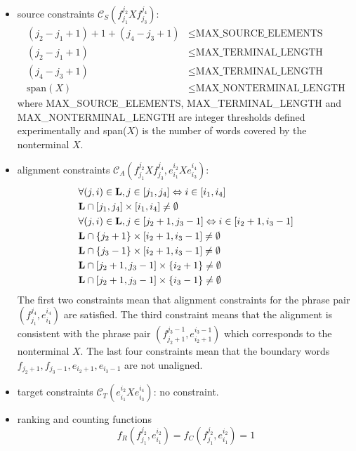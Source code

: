 \begin{itemize}
  \item source constraints $\mathcal{C}_S(f_{j_1}^{j_2} X f_{j_3}^{j_4})$:
%
\begin{equation}
  \begin{split}
    (j_2 - j_1 + 1) + 1 + (j_4 - j_3 + 1) &\leq \mbox{MAX\_SOURCE\_ELEMENTS} \\
    (j_2 - j_1 + 1) &\leq \mbox{MAX\_TERMINAL\_LENGTH} \\
    (j_4 - j_3 + 1) &\leq \mbox{MAX\_TERMINAL\_LENGTH} \\
    \mbox{span}(X) &\leq \mbox{MAX\_NONTERMINAL\_LENGTH}
  \end{split}
\end{equation}
%
where MAX\_SOURCE\_ELEMENTS, MAX\_TERMINAL\_LENGTH and MAX\_NONTERMINAL\_LENGTH
are integer thresholds defined experimentally and span($X$) is the number of
words covered by the nonterminal $X$.
  \item alignment constraints $\mathcal{C}_A(f_{j_1}^{j_2} X f_{j_3}^{j_4}, e_{i_1}^{i_2} X e_{i_3}^{i_4})$:
\begin{equation}
\begin{split}
  & \forall (j,i) \in {\bf L}, j \in [j_1, j_4] \Leftrightarrow i \in [i_1,i_4] \\
  & {\bf L} \cap [j_1, j_4] \times [i_1, i_4] \neq \emptyset \\
  & \forall (j,i) \in {\bf L}, j \in [j_2 + 1, j_3 - 1] \Leftrightarrow i \in [i_2 + 1, i_3 - 1] \\
  & {\bf L} \cap \{j_2 + 1\} \times [i_2 + 1, i_3 - 1] \neq \emptyset \\
  & {\bf L} \cap \{j_3 - 1\} \times [i_2 + 1, i_3 - 1] \neq \emptyset \\
  & {\bf L} \cap [j_2 + 1, j_3 - 1] \times \{i_2 + 1\} \neq \emptyset \\
  & {\bf L} \cap [j_2 + 1, j_3 - 1] \times \{i_3 - 1\} \neq \emptyset
\end{split}
\end{equation}
%
The first two constraints mean that alignment constraints for the phrase pair
$(f_{j_1}^{j_4}, e_{i_1}^{i_4})$ are satisfied. The third constraint means that
the alignment
is consistent with the phrase pair
$(f_{j_2 + 1}^{j_3 - 1}, e_{i_2 + 1}^{i_3 - 1})$ which corresponds to the
nonterminal $X$. The last four constraints
mean that the boundary words
$f_{j_2 + 1}, f_{j_3 - 1}, e_{i_2 + 1}, e_{i_3 - 1}$ are not unaligned.
  \item target constraints $\mathcal{C}_T(e_{i_1}^{i_2} X e_{i_3}^{i_4})$: no
constraint.
  \item ranking and counting functions
%
\begin{equation}
  f_R(f_{j_1}^{j_2},e_{i_1}^{i_2}) = f_C(f_{j_1}^{j_2},e_{i_1}^{i_2}) = 1
\end{equation}
\end{itemize}
